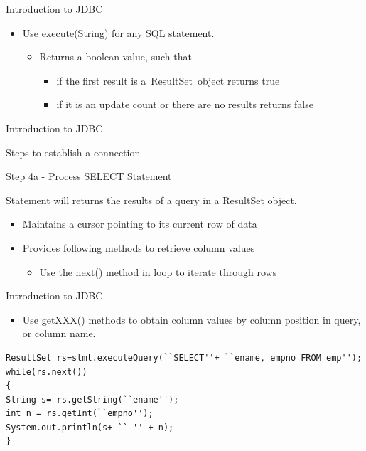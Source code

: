 \documentclass[14pt]{beamer}
\begin{document}
\begin{frame}{Introduction to JDBC}
\begin{itemize} 
\item Use execute(String) for any SQL statement.
\begin{itemize} 
\item Returns a boolean value, such that 
\begin{itemize}
\item if the first result is a ResultSet object returns true
\item if it is an update count or there are no results returns false
\end{itemize}
\end{itemize}
\end{itemize}
\end{frame}


\begin{frame}{Introduction to JDBC}
\begin{block}{}
Steps to establish a connection 
\end{block}
\begin{block}{}
Step 4a - Process SELECT Statement
\end{block}
Statement will returns the results of a query in a ResultSet object.
\begin{itemize} 
\item Maintains a cursor pointing to its current row of data
\item Provides following methods to retrieve column values
\begin{itemize} 
\item Use the next() method in loop to iterate through rows

\end{itemize}
\end{itemize}
\end{frame}

\begin{frame}[fragile]{Introduction to JDBC}
\begin{itemize} 
\item Use getXXX() methods to obtain column values by column  position in query, or column name.
\end{itemize}
\begin{lstlisting}[numbers=none]
ResultSet rs=stmt.executeQuery(``SELECT''+ ``ename, empno FROM emp'');
while(rs.next())
{
String s= rs.getString(``ename'');
int n = rs.getInt(``empno'');
System.out.println(s+ ``-'' + n);
}
\end{lstlisting}
\end{frame}
\end{document}
